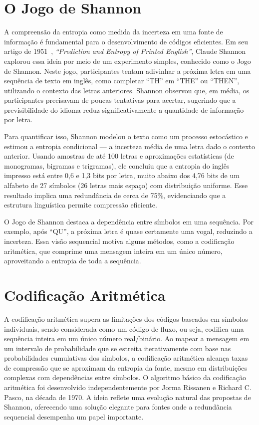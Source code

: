 \section{O Jogo de Shannon}

A compreensão da entropia como medida da incerteza em uma fonte de informação é
fundamental para o desenvolvimento de códigos eficientes. Em seu artigo de
1951~\parencite{Shannon1951}, \textit{``Prediction and Entropy of Printed English''}, Claude Shannon
explorou essa ideia por meio de um experimento simples,
conhecido como o Jogo de Shannon. Neste jogo, participantes tentam adivinhar a
próxima letra em uma sequência de texto em inglês, como completar ``TH'' em
``THE'' ou ``THEN'', utilizando o contexto das letras anteriores. Shannon
observou que, em média, os participantes precisavam de poucas tentativas para
acertar, sugerindo que a previsibilidade do idioma reduz significativamente a
quantidade de informação por letra.

Para quantificar isso, Shannon modelou o texto como um processo estocástico e
estimou a entropia condicional --- a incerteza média de uma letra dado o
contexto anterior. Usando amostras de até 100 letras e aproximações estatísticas
(de monogramas, bigramas e trigramas), ele concluiu que a entropia do inglês impresso
está entre 0,6 e 1,3 bits por letra, muito abaixo dos 4,76 bits de um alfabeto
de 27 símbolos (26 letras mais espaço) com distribuição uniforme. Esse
resultado implica uma redundância de cerca de 75\%, evidenciando que a
estrutura linguística permite compressão eficiente.

O Jogo de Shannon destaca a
dependência entre símbolos em uma sequência. Por exemplo, após ``QU'', a
próxima letra é quase certamente uma vogal, reduzindo a incerteza. Essa visão
sequencial motiva alguns métodos, como a codificação aritmética, que
comprime uma mensagem inteira em um único número, aproveitando a entropia de
toda a sequência.









\section{Codificação Aritmética}

A codificação aritmética supera as limitações dos códigos baseados em símbolos
individuais, sendo considerada como um código de fluxo, ou seja, codifica uma
sequência inteira em um único número real/binário. Ao mapear a mensagem em um
intervalo de probabilidade que se estreita iterativamente com base nas
probabilidades cumulativas dos símbolos, a codificação aritmética alcança taxas
de compressão que se aproximam da entropia da fonte, mesmo em distribuições
complexas com dependências entre símbolos. O algoritmo básico da codificação
aritmética foi desenvolvido independentemente por Jorma Rissanen e Richard C.
Pasco, na década de 1970. A ideia reflete uma evolução natural das propostas de
Shannon, oferecendo uma solução elegante para fontes onde a redundância
sequencial desempenha um papel importante.

